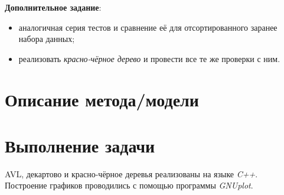 \documentclass[12pt, a4paper]{report}
\begin{document}
	\par
	\textbf{Дополнительное задание}:
	\begin{itemize}
		\item аналогичная серия тестов и сравнение её для отсортированного заранее набора данных;
		\item реализовать \textit{красно-чёрное дерево} и провести все те же проверки с ним.
	\end{itemize}
	
	\newpage

	\section*{Описание метода/модели}
	\large

	\newpage

	\section*{Выполнение задачи}
	AVL, декартово и красно-чёрное деревья реализованы на языке \textit{C++}. Построение графиков проводились с помощью программы \textit{GNUplot}.

	\newpage
	\vfill
	
\end{document}
